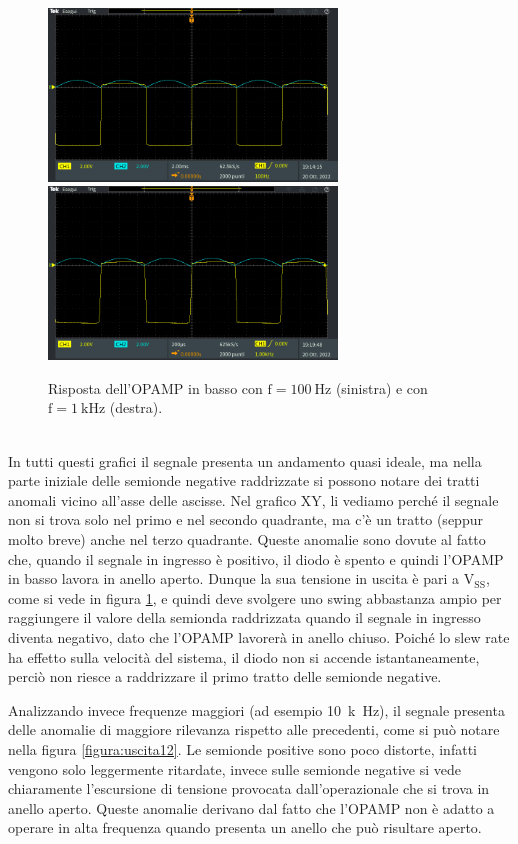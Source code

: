 \documentclass{report}
\begin{document}
\begin{figure}[h!]
	\centering
	\includegraphics[height=4.6cm]{immagini/TEK00002}
	\includegraphics[height=4.6cm]{immagini/TEK00004}
	\caption{Risposta dell'OPAMP in basso con $\mathrm{f= \SI{100}{\hertz}}$ (sinistra) e con $\mathrm{f= \SI{1}{k\hertz}}$ (destra).}
	\label{figura:uscita111}
\end{figure}
\\\indent In tutti questi grafici il segnale presenta un andamento quasi ideale, ma nella parte iniziale delle semionde negative raddrizzate si possono notare dei tratti anomali vicino all'asse delle ascisse. Nel grafico XY, li vediamo perché il segnale non si trova solo nel primo e nel secondo quadrante, ma c'è un tratto (seppur molto breve) anche nel terzo quadrante. Queste anomalie sono dovute al fatto che, quando il segnale in ingresso è positivo, il diodo è spento e quindi l'OPAMP in basso lavora in anello aperto. Dunque la sua tensione in uscita è pari a $\displaystyle\mathrm{V_{SS}}$, come si vede in figura \ref{figura:uscita111}, e quindi deve svolgere uno swing abbastanza ampio per raggiungere il valore della semionda raddrizzata  quando il segnale in ingresso diventa negativo, dato che l'OPAMP lavorerà in anello chiuso. Poiché lo slew rate ha effetto sulla velocità del sistema, il diodo non si accende istantaneamente, perciò non riesce a raddrizzare il primo tratto delle semionde negative.\par
Analizzando invece frequenze maggiori (ad esempio \SI{10}{k\hertz}), il segnale presenta delle anomalie di maggiore rilevanza rispetto alle precedenti, come si può notare nella figura \ref{figura:uscita12}. Le semionde positive sono poco distorte, infatti vengono solo leggermente ritardate, invece sulle semionde negative si vede chiaramente l'escursione di tensione provocata dall'operazionale che si trova in anello aperto. Queste anomalie derivano dal fatto che l'OPAMP non è adatto a operare in alta frequenza quando presenta un anello che può risultare aperto.
\end{document}
